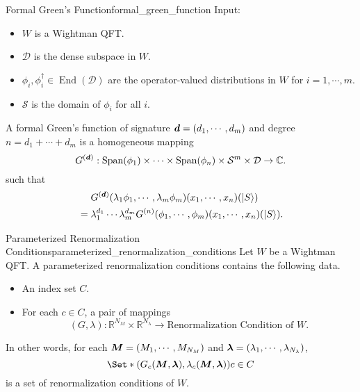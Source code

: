 \documentclass{article}
\begin{document}
\begin{definition}{Formal Green's Function}{formal_green_function}
    Input:
    \begin{itemize}
        \item $W$ is a Wightman QFT.
        \item $\mathcal{D}$ is the dense subspace in $W$.
        \item $\phi_i,\phi^\dagger_i\in \operatorname{End}(\mathcal{D})$ are the operator-valued distributions in $W$ for $i=1,\cdots,m$.
        \item $\mathcal{S}$ is the domain of $\phi_i$ for all $i$.
    \end{itemize}
    A formal Green's function of signature $\vb*{d} = (d_1,\cdots,d_m)$ and degree $n = d_1 + \cdots + d_m$ is a homogeneous mapping
    \[ G^{(\vb*{d})}: \operatorname{Span}(\phi_1) \times \cdots \times \operatorname{Span}(\phi_n) \times \mathcal{S}^m \times \mathcal{D} \rightarrow \mathbb{C}. \]
    such that
    \begin{align*}
        &{\phantom{{}={}}} G^{(\vb*{d})}(\lambda_1 \phi_1,\cdots,\lambda_m \phi_m)(x_1,\cdots,x_n)(\ket{S}) \\
        &= \lambda_1^{d_1} \cdots \lambda_m^{d_m} G^{(n)}(\phi_1,\cdots,\phi_m)(x_1,\cdots,x_n)(\ket{S}).
    \end{align*}
\end{definition}

\begin{definition}{Parameterized Renormalization Conditions}{parameterized_renormalization_conditions}
    Let $W$ be a Wightman QFT.
    A parameterized renormalization conditions contains the following data.
    \begin{itemize}
        \item An index set $C$.
        \item For each $c\in C$, a pair of mappings
        \[ (G,\lambda): \mathbb{R}^{N_M}\times \mathbb{R}^{N_\lambda} \rightarrow \text{Renormalization Condition of $W$}. \]
    \end{itemize}
    In other words, for each $\vb*{M} = (M_1,\cdots,M_{N_M})$ and $\vb*{\lambda} = (\lambda_1,\cdots,\lambda_{N_\lambda})$,
    \[ \Set*{(G_c(\vb*{M}, \vb*{\lambda}),\lambda_c(\vb*{M}, \vb*{\lambda}))}{c\in C} \]
    is a set of renormalization conditions of $W$.
\end{definition}
\end{document}
